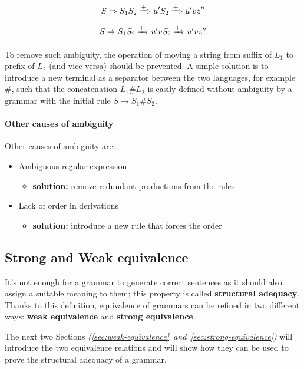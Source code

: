 \documentclass[english]{article}
\begin{document}
\[S \Rightarrow S_1 S_2 \xRightarrow{+} u^\prime S_2 \xRightarrow{+} u^\prime v z^{\prime \prime}\]
\[S \Rightarrow S_1 S_2 \xRightarrow{+} u^\prime v S_2 \xRightarrow{+} u^\prime v z^{\prime \prime}\]

To remove such ambiguity, the operation of moving a string from suffix of \(L_1\) to prefix of \(L_2\) (and vice versa) should be prevented.
A simple solution is to introduce a new terminal as a separator between the two languages, for example \(\#\), such that the concatenation \(L_1 \# L_2\) is easily defined without ambiguity by a grammar with the initial rule \(S \rightarrow S_1 \# S_2\).

\paragraph{Other causes of ambiguity}
\label{par:other-causes-of-ambiguity}

Other causes of ambiguity are:

\begin{itemize}
  \item Ambiguous regular expression
        \begin{itemize}[label=\(\rightarrow\)]
          \item \textbf{solution:} remove redundant productions from the rules
        \end{itemize}
  \item Lack of order in derivations
        \begin{itemize}[label=\(\rightarrow\)]
          \item \textbf{solution:} introduce a new rule that forces the order
        \end{itemize}
\end{itemize}

\subsection{Strong and Weak equivalence}

It's not enough for a grammar to generate correct sentences as it should also assign a suitable meaning to them;
this property is called \textbf{structural adequacy}.
Thanks to this definition, equivalence of grammars can be refined in two different ways:
\textbf{weak equivalence} and \textbf{strong equivalence}.

The next two Sections \textit{(\ref{sec:weak-equivalence}~and~\ref{sec:strong-equivalence})} will introduce the two equivalence relations and will show how they can be used to prove the structural adequacy of a grammar.
\end{document}
